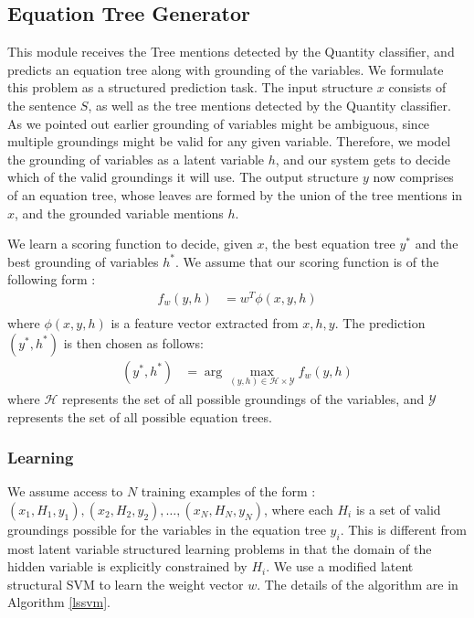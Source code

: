   \subsection{Equation Tree Generator}

    This module receives the Tree mentions detected by the Quantity
    classifier, and predicts an equation tree along with grounding of
    the variables. We formulate this problem as a structured
    prediction task.  The input structure $x$ consists of the sentence
    $S$, as well as the tree mentions detected by the Quantity
    classifier. As we pointed out earlier grounding of variables might
    be ambiguous, since multiple groundings might be valid for any
    given variable. Therefore, we model the grounding of variables as
    a latent variable $h$, and our system gets to decide which of the
    valid groundings it will use. The output structure $y$ now
    comprises of an equation tree, whose leaves are formed by the
    union of the tree mentions in $x$, and the grounded variable
    mentions $h$.

    We learn a scoring function to decide, given $x$, the best
    equation tree $y^*$ and the best grounding of variables $h^*$. We
    assume that our scoring function is of the following form :
    \begin{align*}
      f_w(y, h) &= w^T\phi(x, y, h) \\ 
    \end{align*}  
    where $\phi(x, y, h)$ is a feature vector extracted from $x, h,
    y$. The prediction $(y^*, h^*)$ is then chosen as follows:
    \begin{align*}
      (y^*, h^*) &= \arg\max_{(y, h)\in \mathcal{H} \times \mathcal{Y}} f_w(y, h)
    \end{align*}
    where $\mathcal{H}$ represents the set of all possible groundings
    of the variables, and $\mathcal{Y}$ represents the set of all
    possible equation trees.

    \subsubsection{Learning}
    \label{sec:prediction}
      We assume access to $N$ training examples of the form : $(x_1,
      H_1, y_1), (x_2, H_2, y_2), \ldots, (x_N, H_N, y_N)$, where each
      $H_i$ is a set of valid groundings possible for the variables in
      the equation tree $y_i$. This is different from most latent
      variable structured learning problems in that the domain of the
      hidden variable is explicitly constrained by $H_i$. We use a
      modified latent structural SVM to learn the weight vector
      $w$. The details of the algorithm are in Algorithm \ref{lssvm}.

